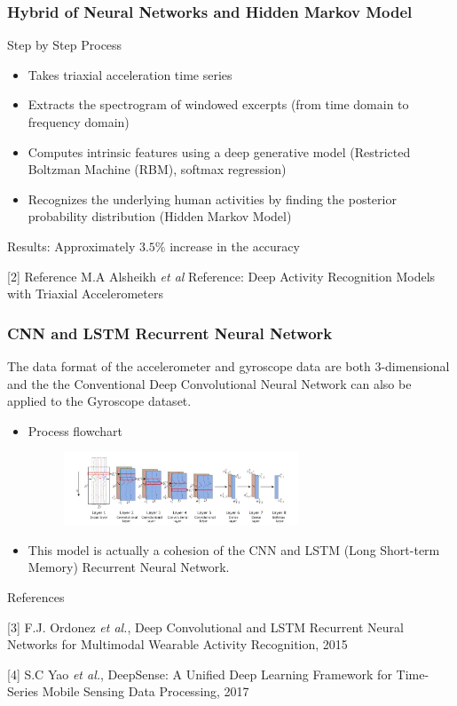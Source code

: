 \documentclass{beamer} %
\begin{document}
\begin{frame}
\frametitle{Hybrid of Neural Networks and Hidden Markov Model}
Step by Step Process
\begin{itemize}
\item[(1)] Takes triaxial acceleration time series 
\item[(2)] Extracts the spectrogram of windowed excerpts (from time domain to frequency domain) 
\item[(3)] Computes intrinsic features using a deep
generative model (Restricted Boltzman Machine (RBM), softmax regression)
\item[(4)] Recognizes the underlying
human activities by finding the posterior probability distribution (Hidden Markov Model)

\end{itemize}

Results: Approximately $3.5\%$ increase in the accuracy

\vspace{2em}
\scriptsize [2] Reference M.A Alsheikh \textit{et al} Reference: Deep Activity Recognition Models with Triaxial Accelerometers 

\end{frame}


\begin{frame}
\frametitle{CNN and LSTM Recurrent Neural Network}

The data format of the accelerometer and gyroscope data are both 3-dimensional and the the Conventional Deep Convolutional Neural Network can also be applied to the Gyroscope dataset.

\begin{itemize}
\item Process flowchart

 \begin{figure}[htbp] 
	
	\begin{center}
		\includegraphics[width=7cm]{./image/g1} 	
	\end{center}
\end{figure}

\item This model is actually a cohesion of the CNN and LSTM (Long Short-term Memory) Recurrent Neural Network. 
\end{itemize}

\scriptsize References

\tiny [3] F.J. Ordonez \textit{et al.}, Deep Convolutional and LSTM Recurrent Neural Networks for Multimodal Wearable Activity Recognition, 2015

\tiny [4] S.C Yao \textit{et al.}, DeepSense: A Unified Deep Learning Framework for Time-Series Mobile Sensing Data Processing, 2017


\end{frame}
\end{document}
